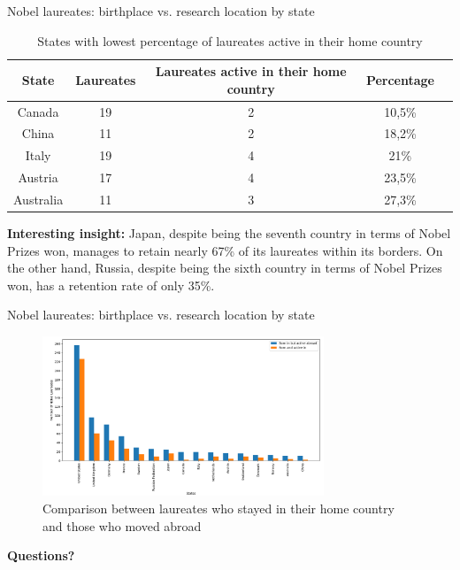 \documentclass[aspectratio=169,xcolor=dvipsnames]{beamer}
\begin{document}
\begin{frame}{Nobel laureates: birthplace vs. research location by state}
	\vspace{-1em}
	\begin{table}[h!]
		\centering
		\caption{States with lowest percentage of laureates active in their home country}
		\begin{tabular}{|c|c|c|c|c|}
			\hline
			\textbf{State} & \textbf{Laureates} & \textbf{Laureates active in their home country} & \textbf{Percentage} \\ \hline
			Canada         & 19                 & 2                                               & 10,5\%              \\ \hline
			China          & 11                 & 2                                               & 18,2\%              \\ \hline
			Italy          & 19                 & 4                                               & 21\%                \\ \hline
			Austria        & 17                 & 4                                               & 23,5\%              \\ \hline
			Australia      & 11                 & 3                                               & 27,3\%              \\ \hline
		\end{tabular}
		\label{tab:laureates_active}
	\end{table}

	\textbf{Interesting insight:} Japan, despite being the seventh country in terms of Nobel
Prizes won, manages to retain nearly 67\% of its laureates within its borders. On the other hand, Russia, despite
being the sixth country in terms of Nobel Prizes won, has a retention rate of only 35\%.

\end{frame}

\begin{frame}{Nobel laureates: birthplace vs. research location by state}
	\begin{figure}[H]
		\centering
		\includegraphics[width=0.75\textwidth]{../queries/plots/laureatesComparison.png}
		\caption{Comparison between laureates who stayed in their home country and those who moved abroad}
		\label{fig:laureatesComparison}
	\end{figure}
\end{frame}

\begin{frame}
	\Huge{\centerline{\textbf{Questions?}}}
\end{frame}
\end{document}

